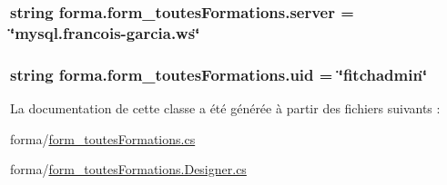 \subsubsection[{\texorpdfstring{server}{server}}]{\setlength{\rightskip}{0pt plus 5cm}string forma.\+form\+\_\+toutes\+Formations.\+server = \char`\"{}mysql.\+francois-\/garcia.\+ws\char`\"{}}\hypertarget{classforma_1_1form__toutes_formations_ac2fc023d0d173de0a3fee821eb67a8d2}{}\label{classforma_1_1form__toutes_formations_ac2fc023d0d173de0a3fee821eb67a8d2}
\subsubsection[{\texorpdfstring{uid}{uid}}]{\setlength{\rightskip}{0pt plus 5cm}string forma.\+form\+\_\+toutes\+Formations.\+uid = \char`\"{}fitchadmin\char`\"{}}\hypertarget{classforma_1_1form__toutes_formations_ab7b6eb3fd620befc4e18ba3056a7b3ca}{}\label{classforma_1_1form__toutes_formations_ab7b6eb3fd620befc4e18ba3056a7b3ca}


La documentation de cette classe a été générée à partir des fichiers suivants \+:\begin{DoxyCompactItemize}
\item 
forma/\hyperlink{form__toutes_formations_8cs}{form\+\_\+toutes\+Formations.\+cs}\item 
forma/\hyperlink{form__toutes_formations_8_designer_8cs}{form\+\_\+toutes\+Formations.\+Designer.\+cs}\end{DoxyCompactItemize}
